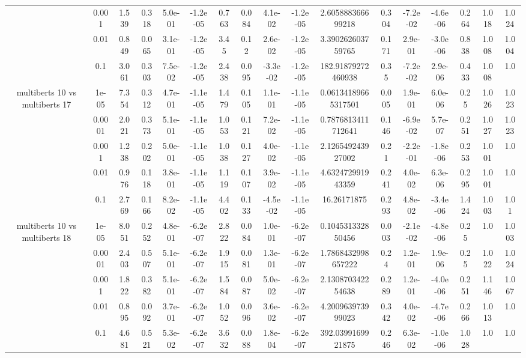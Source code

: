 \begin{tabular}{|c|c|c|c|c|c|c|c|c|c|c|c|c|c|c|c|c|}
 & 0.001 & 1.539 & 0.318 & 5.0e-01 & -1.2e-05 & 0.763 & 0.084 & 4.1e-02 & -1.2e-05 & 2.605888366699218 & 0.304 & -7.2e-02 & -4.6e-06 & 0.264 & 1.018 & 1.024 \\
 & 0.01 & 0.849 & 0.065 & 3.1e-01 & -1.2e-05 & 3.45 & 0.12 & 2.6e-02 & -1.2e-05 & 3.390262603759765 & 0.171 & 2.9e-01 & -3.0e-06 & 0.838 & 1.008 & 1.004 \\
 & 0.1 & 3.061 & 0.303 & 7.5e-02 & -1.2e-05 & 2.438 & 0.095 & -3.3e-02 & -1.2e-05 & 182.91879272460938 & 0.35 & -7.2e-02 & 2.9e-06 & 0.433 & 1.008 & 1.0 \\
\hline
\multirow{5}{*}{multiberts 10 vs multiberts 17} & 1e-05 & 7.354 & 0.312 & 4.7e-01 & -1.1e-05 & 1.479 & 0.105 & 1.1e-01 & -1.1e-05 & 0.06134189665317501 & 0.005 & 1.9e-01 & 6.0e-06 & 0.25 & 1.026 & 1.023 \\
 & 0.0001 & 2.021 & 0.373 & 5.1e-01 & -1.1e-05 & 1.053 & 0.121 & 7.2e-02 & -1.1e-05 & 0.7876813411712641 & 0.146 & -6.9e-02 & 5.7e-07 & 0.251 & 1.027 & 1.023 \\
 & 0.001 & 1.238 & 0.202 & 5.0e-01 & -1.1e-05 & 1.038 & 0.127 & 4.0e-02 & -1.1e-05 & 2.126549243927002 & 0.21 & -2.2e-01 & -1.8e-06 & 0.253 & 1.001 & 1.0 \\
 & 0.01 & 0.976 & 0.118 & 3.8e-01 & -1.1e-05 & 1.119 & 0.107 & 3.9e-02 & -1.1e-05 & 4.632472991943359 & 0.241 & 4.0e-02 & 6.3e-06 & 0.295 & 1.001 & 1.0 \\
 & 0.1 & 2.769 & 0.166 & 8.2e-02 & -1.1e-05 & 4.402 & 0.133 & -4.5e-02 & -1.1e-05 & 16.26171875 & 0.293 & 4.8e-02 & -3.4e-06 & 1.424 & 1.003 & 1.01 \\
\hline
\multirow{5}{*}{multiberts 10 vs multiberts 18} & 1e-05 & 8.051 & 0.252 & 4.8e-01 & -6.2e-07 & 2.822 & 0.084 & 1.0e-01 & -6.2e-07 & 0.104531332850456 & 0.003 & -2.1e-02 & -4.8e-06 & 0.25 & 1.0 & 1.003 \\
 & 0.0001 & 2.403 & 0.507 & 5.1e-01 & -6.2e-07 & 1.915 & 0.081 & 1.3e-01 & -6.2e-07 & 1.7868432998657222 & 0.24 & 1.2e-01 & 1.9e-06 & 0.25 & 1.022 & 1.024 \\
 & 0.001 & 1.822 & 0.382 & 5.1e-01 & -6.2e-07 & 1.584 & 0.087 & 5.0e-02 & -6.2e-07 & 2.130870342254638 & 0.289 & 1.2e-01 & -4.0e-06 & 0.251 & 1.146 & 1.067 \\
 & 0.01 & 0.895 & 0.092 & 3.7e-01 & -6.2e-07 & 1.052 & 0.096 & 3.6e-02 & -6.2e-07 & 4.200963973999023 & 0.342 & 4.0e-02 & -4.7e-06 & 0.266 & 1.013 & 1.0 \\
 & 0.1 & 4.681 & 0.521 & 5.3e-02 & -6.2e-07 & 3.632 & 0.088 & 1.8e-04 & -6.2e-07 & 392.0399169921875 & 0.246 & 6.3e-02 & -1.0e-06 & 1.028 & 1.0 & 1.0 \\

\end{tabular}
